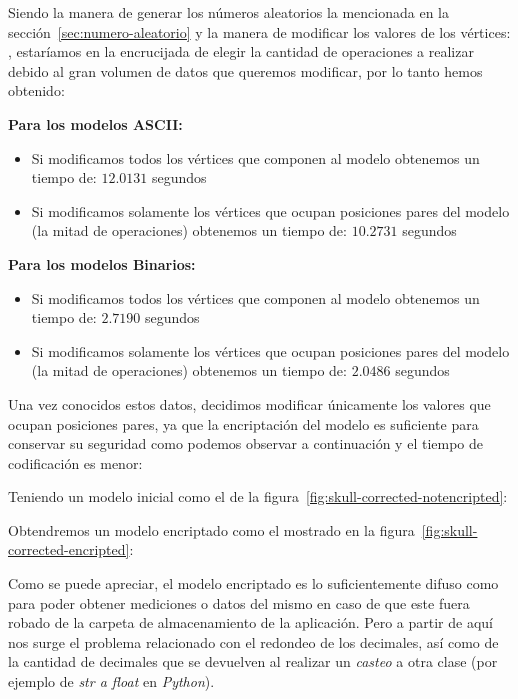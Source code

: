 Siendo la manera de generar los números aleatorios la mencionada en la sección~\ref{sec:numero-aleatorio} y la manera de modificar los valores de los vértices: , estaríamos en la encrucijada de elegir la cantidad de operaciones a realizar debido al gran volumen de datos que queremos modificar, por lo tanto hemos obtenido:

\textbf{Para los modelos ASCII:}
\begin{itemize}
	\item Si modificamos todos los vértices que componen al modelo obtenemos un tiempo de: $12.0131$ segundos
	\item Si modificamos solamente los vértices que ocupan posiciones pares del modelo (la mitad de operaciones) obtenemos un tiempo de: $10.2731$ segundos
\end{itemize}

\textbf{Para los modelos Binarios:}
\begin{itemize}
	\item Si modificamos todos los vértices que componen al modelo obtenemos un tiempo de: $2.7190$ segundos
	\item Si modificamos solamente los vértices que ocupan posiciones pares del modelo (la mitad de operaciones) obtenemos un tiempo de: $2.0486$ segundos
\end{itemize}

Una vez conocidos estos datos, decidimos modificar únicamente los valores que ocupan posiciones pares, ya que la encriptación del modelo es suficiente para conservar su seguridad como podemos observar a continuación y el tiempo de codificación es menor:

Teniendo un modelo inicial como el de la figura~\ref{fig:skull-corrected-notencripted}:

Obtendremos un modelo encriptado como el mostrado en la figura~\ref{fig:skull-corrected-encripted}:

Como se puede apreciar, el modelo encriptado es lo suficientemente difuso como para poder obtener mediciones o datos del mismo en caso de que este fuera robado de la carpeta de almacenamiento de la aplicación. Pero a partir de aquí nos surge el problema relacionado con el redondeo de los decimales, así como de la cantidad de decimales que se devuelven al realizar un \textit{casteo} a otra clase (por ejemplo de \textit{str a float} en \textit{Python}).

